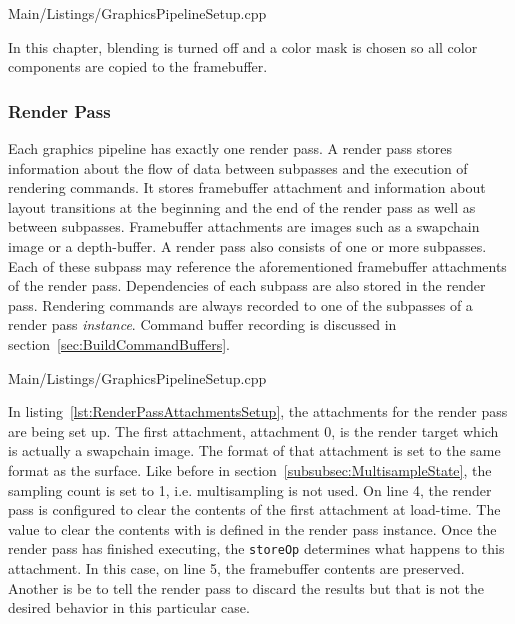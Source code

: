         
        {Main/Listings/GraphicsPipelineSetup.cpp}

        In this chapter, blending is turned off and a color mask is chosen so all color components are copied to the framebuffer.

      \subsubsection{Render Pass}

        Each graphics pipeline has exactly one render pass.
        A render pass stores information about the flow of data between subpasses and the execution of rendering commands.
        It stores framebuffer attachment and information about layout transitions at the beginning and the end of the render pass as well as between subpasses.
        Framebuffer attachments are images such as a swapchain image or a depth-buffer.
        A render pass also consists of one or more subpasses.
        Each of these subpass may reference the aforementioned framebuffer attachments of the render pass.
        Dependencies of each subpass are also stored in the render pass.
        Rendering commands are always recorded to one of the subpasses of a render pass \textit{instance}.
        Command buffer recording is discussed in section~\ref{sec:BuildCommandBuffers}.

        
        {Main/Listings/GraphicsPipelineSetup.cpp}

        In listing~\ref{lst:RenderPassAttachmentsSetup}, the attachments for the render pass are being set up.
        The first attachment, attachment 0, is the render target which is actually a swapchain image.
        The format of that attachment is set to the same format as the surface.
        Like before in section~\ref{subsubsec:MultisampleState}, the sampling count is set to 1, i.e. multisampling is not used.
        On line 4, the render pass is configured to clear the contents of the first attachment at load-time.
        The value to clear the contents with is defined in the render pass instance.
        Once the render pass has finished executing, the \lstinline{storeOp} determines what happens to this attachment.
        In this case, on line 5, the framebuffer contents are preserved.
        Another is be to tell the render pass to discard the results but that is not the desired behavior in this particular case.

